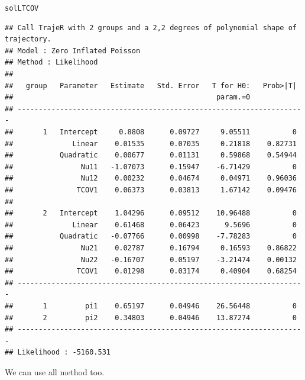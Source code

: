 \documentclass{article}\usepackage[]{graphicx}\usepackage[]{color}
\makeatletter
\newcommand{\hlstd}[1]{\textcolor[rgb]{0.345,0.345,0.345}{#1}}%
\newenvironment{kframe}{%
 \def\at@end@of@kframe{}%
 \ifinner\ifhmode%
  \def\at@end@of@kframe{\end{minipage}}%
  \begin{minipage}{\columnwidth}%
 \fi\fi%
 \def\FrameCommand##1{\hskip\@totalleftmargin \hskip-\fboxsep
 \colorbox{shadecolor}{##1}\hskip-\fboxsep
     \hskip-\linewidth \hskip-\@totalleftmargin \hskip\columnwidth}%
 \MakeFramed {\advance\hsize-\width
   \@totalleftmargin\z@ \linewidth\hsize
   \@setminipage}}%
 {\par\unskip\endMakeFramed%
 \at@end@of@kframe}
\newenvironment{knitrout}{}{} %
\makeatother
\begin{document}
\begin{knitrout}
\color{fgcolor}\begin{kframe}
\begin{alltt}
\hlstd{solLTCOV}
\end{alltt}
\begin{verbatim}
## Call TrajeR with 2 groups and a 2,2 degrees of polynomial shape of trajectory.
## Model : Zero Inflated Poisson
## Method : Likelihood 
##  
##   group   Parameter   Estimate   Std. Error   T for H0:   Prob>|T|  
##                                                param.=0             
## --------------------------------------------------------------------
##       1   Intercept     0.8808      0.09727     9.05511          0  
##              Linear    0.01535      0.07035     0.21818    0.82731  
##           Quadratic    0.00677      0.01131     0.59868    0.54944  
##                Nu11   -1.07073      0.15947    -6.71429          0  
##                Nu12    0.00232      0.04674     0.04971    0.96036  
##               TCOV1    0.06373      0.03813     1.67142    0.09476  
##                                                                     
##       2   Intercept    1.04296      0.09512    10.96488          0  
##              Linear    0.61468      0.06423      9.5696          0  
##           Quadratic   -0.07766      0.00998    -7.78283          0  
##                Nu21    0.02787      0.16794     0.16593    0.86822  
##                Nu22   -0.16707      0.05197    -3.21474    0.00132  
##               TCOV1    0.01298      0.03174     0.40904    0.68254  
## --------------------------------------------------------------------
##       1         pi1    0.65197      0.04946    26.56448          0  
##       2         pi2    0.34803      0.04946    13.87274          0  
## --------------------------------------------------------------------
## Likelihood : -5160.531
\end{verbatim}
\end{kframe}
\end{knitrout}
We can use all method too.
\end{document}
